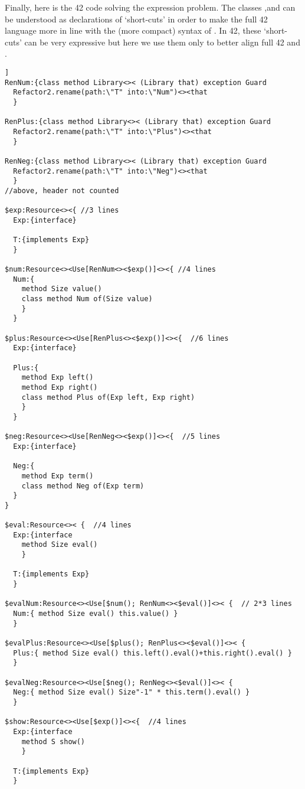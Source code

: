 Finally, here is the 42 code solving the expression problem.
The classes \Q@RenNum@,\Q@RenPlus@ and \Q@RenNeg@
can be understood as declarations of `short-cuts'
in order to make the full 42 language more in line with the
(more compact) syntax of \name.
In 42, these `short-cuts' can be very expressive 
but here we use them only to better align full 42 and \name.
\begin{lstlisting}[basicstyle=\tiny, mathescape=false]]
RenNum:{class method Library<>< (Library that) exception Guard
  Refactor2.rename(path:\"T" into:\"Num")<><that
  }

RenPlus:{class method Library<>< (Library that) exception Guard
  Refactor2.rename(path:\"T" into:\"Plus")<><that
  }

RenNeg:{class method Library<>< (Library that) exception Guard
  Refactor2.rename(path:\"T" into:\"Neg")<><that
  }
//above, header not counted

$exp:Resource<><{ //3 lines
  Exp:{interface}

  T:{implements Exp}
  }

$num:Resource<><Use[RenNum<><$exp()]<><{ //4 lines
  Num:{
    method Size value()
    class method Num of(Size value)
    }
  }

$plus:Resource<><Use[RenPlus<><$exp()]<><{  //6 lines
  Exp:{interface}

  Plus:{
    method Exp left()
    method Exp right()
    class method Plus of(Exp left, Exp right)
    }
  }

$neg:Resource<><Use[RenNeg<><$exp()]<><{  //5 lines
  Exp:{interface}

  Neg:{
    method Exp term()
    class method Neg of(Exp term)
  }
}

$eval:Resource<>< {  //4 lines
  Exp:{interface
    method Size eval()
    }

  T:{implements Exp}
  }

$evalNum:Resource<><Use[$num(); RenNum<><$eval()]<>< {  // 2*3 lines
  Num:{ method Size eval() this.value() }
  }

$evalPlus:Resource<><Use[$plus(); RenPlus<><$eval()]<>< {
  Plus:{ method Size eval() this.left().eval()+this.right().eval() }
  }

$evalNeg:Resource<><Use[$neg(); RenNeg<><$eval()]<>< {
  Neg:{ method Size eval() Size"-1" * this.term().eval() }
  }

$show:Resource<><Use[$exp()]<><{  //4 lines
  Exp:{interface
    method S show()
    }

  T:{implements Exp}
  }


\end{lstlisting}
